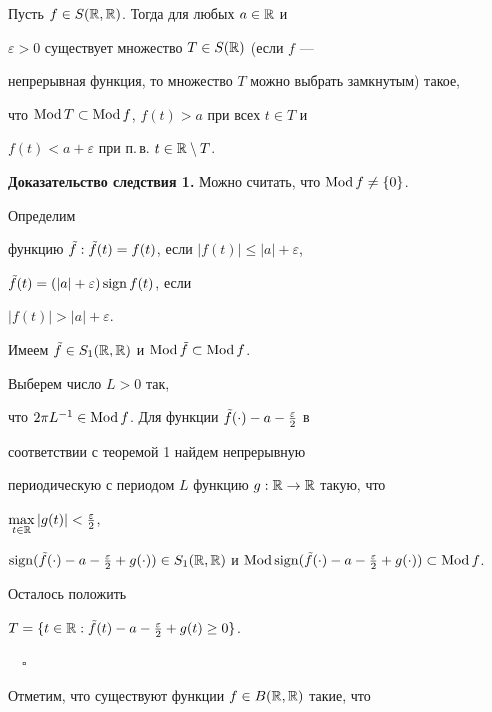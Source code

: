 \begin{cor}


Пусть $f\in S(\Bbb R,\Bbb R)$. Тогда для любых $a\in\Bbb R$ и


$\varepsilon>0$ существует множество $T\in S(\Bbb R)$ (если $f$ ---


непрерывная функция, то множество $T$ можно выбрать замкнутым) такое,


что $\operatorname{Mod} T\subset \operatorname{Mod} f$, $f(t)>a$ при всех $t\in T$ и


$f(t)<a+\varepsilon$ при п.\,в. $t\in\Bbb R\setminus T$.


\end{cor}





{\bf Доказательство следствия 1.} Можно считать, что $\operatorname{Mod} f\ne\{0\}$.


Определим


функцию $\Tilde f:\Tilde f(t)=f(t)$, если $|f(t)|\le|a|+\varepsilon$,


$\Tilde f(t)=(|a|+\varepsilon)\operatorname{sign} f(t)$, если


$|f(t)|>|a|+\varepsilon$.


Имеем $\Tilde f\in S_1(\Bbb R,\Bbb R)$ и $\operatorname{Mod}\Tilde f\subset\operatorname{Mod} f$.


Выберем число $L>0$ так,


что $2\pi L^{-1}\in\Mod f$. Для функции $\Tilde


f(\cdot)-a-\frac{\varepsilon}{2}$ в


соответствии с теоремой 1 найдем непрерывную


периодическую с периодом $L$ функцию $g:\Bbb R\to\Bbb R$ такую, что


$\max\limits_{t\in\Bbb R}|g(t)|<\frac{\varepsilon}{2}$,


$\sign(\Tilde f(\cdot)-a-\frac{\varepsilon}{2}+g(\cdot))\in S_1(\Bbb R,


\Bbb R)$ и $\Mod\sign(\Tilde f(\cdot)-a-\frac{\varepsilon}{2}+g(\cdot))


\subset\Mod f$.


Осталось положить


$T=\{t\in\Bbb R:\Tilde f(t)-a-\frac{\varepsilon}{2}+g(t)\ge 0\}$.


$\quad\square$


\medskip





Отметим, что существуют функции $f\in B(\Bbb R,\Bbb R)$ такие, что


